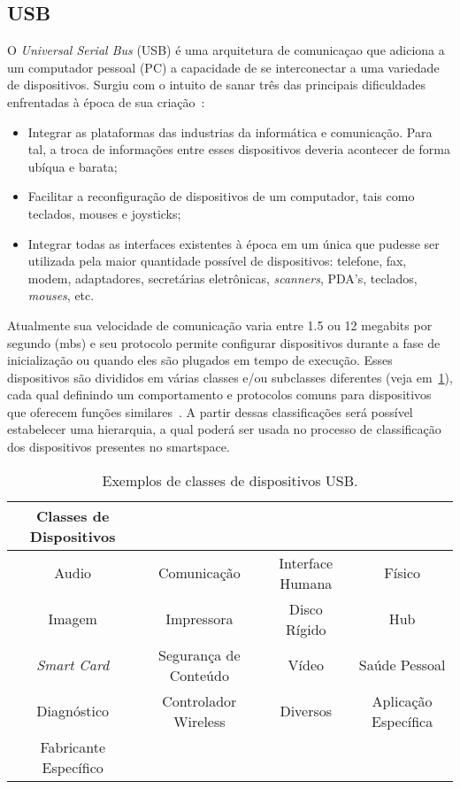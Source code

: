 \subsection{USB}

O \emph{Universal Serial Bus} (USB) é uma arquitetura de comunicaçao que adiciona a um computador pessoal (PC) a capacidade de se interconectar a uma variedade de dispositivos. Surgiu com o intuito de sanar três das principais dificuldades enfrentadas à época de sua criação~\cite{usbspec}:

\begin{itemize}
	\item Integrar as plataformas das industrias da informática e comunicação. Para tal, a troca de informações entre esses dispositivos deveria acontecer de forma ubíqua e barata;
	\item Facilitar a reconfiguração de dispositivos de um computador, tais como teclados, mouses e joysticks;
	\item Integrar todas as interfaces existentes à época em um única que pudesse ser utilizada pela maior quantidade possível de dispositivos: telefone, fax, modem, adaptadores, secretárias eletrônicas, \emph{scanners}, PDA's, teclados, \emph{mouses}, etc.
\end{itemize}

Atualmente sua velocidade de comunicação varia entre 1.5 ou 12 megabits por segundo (mbs) e seu protocolo permite configurar dispositivos durante a fase de inicialização ou quando eles são plugados em tempo de execução. Esses dispositivos são divididos em várias classes e/ou subclasses diferentes (veja em~\ref{tab:dispositivos_usb}), cada qual definindo um comportamento e protocolos comuns para dispositivos que oferecem funções similares~\cite{hid}. A partir dessas classificações será possível estabelecer uma hierarquia, a qual poderá ser usada no processo de classificação dos dispositivos presentes no smartspace.

\begin{table}
	\begin{center}
		\begin{tabular}{cccc}
		\hline
		\textbf{Classes de Dispositivos}																		\\
		\hline
		Audio					&	Comunicação				&	Interface Humana	&	Físico 					\\
		\hline
		Imagem					&	Impressora				&	Disco Rígido		&	Hub 					\\
		\hline
		\emph{Smart Card}		&	Segurança de Conteúdo	&	Vídeo				&	Saúde Pessoal 			\\
		\hline
		Diagnóstico				&	Controlador Wireless	&	Diversos			&	Aplicação Específica	\\
		\hline
		Fabricante Específico	&							&						&							\\
		\hline
		\end{tabular}
	\end{center}
	\caption{Exemplos de classes de dispositivos USB.}
	\label{tab:dispositivos_usb}
\end{table}

